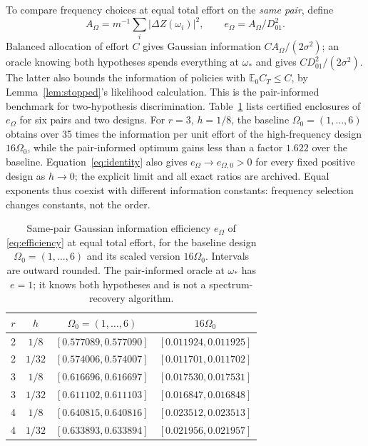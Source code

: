 \documentclass[10pt]{amsart}
\theoremstyle{definition}
\theoremstyle{remark}
\theoremstyle{plain}
\newcommand{\E}{\mathbb E}
\begin{document}
To compare frequency choices at equal total effort on the \emph{same pair}, define
\begin{equation}\label{eq:efficiency}
 A_\Omega=m^{-1}\sum_i|\Delta Z(\omega_i)|^2,\qquad
 e_\Omega=A_\Omega/D_{01}^2.
\end{equation}
Balanced allocation of effort $C$ gives Gaussian information $CA_\Omega/(2\sigma^2)$; an oracle knowing both hypotheses spends everything at $\omega_*$ and gives $CD_{01}^2/(2\sigma^2)$. The latter also bounds the information of policies with $\E_0C_T\le C$, by Lemma~\ref{lem:stopped}'s likelihood calculation. This is the pair-informed benchmark for two-hypothesis discrimination.
Table~\ref{tab:efficiency} lists certified enclosures of $e_\Omega$ for six pairs and two designs. For $r=3$, $h=1/8$, the baseline $\Omega_0=(1,\ldots,6)$ obtains over 35 times the information per unit effort of the high-frequency design $16\Omega_0$, while the pair-informed optimum gains less than a factor $1.622$ over the baseline. Equation~\eqref{eq:identity} also gives $e_\Omega\to e_{\Omega,0}>0$ for every fixed positive design as $h\to0$; the explicit limit and all exact ratios are archived. Equal exponents thus coexist with different information constants: frequency selection changes constants, not the order.

\begin{table}[tb]
\centering
\caption{Same-pair Gaussian information efficiency $e_\Omega$ of \eqref{eq:efficiency} at equal total effort, for the baseline design $\Omega_0=(1,\ldots,6)$ and its scaled version $16\Omega_0$. Intervals are outward rounded. The pair-informed oracle at $\omega_*$ has $e=1$; it knows both hypotheses and is not a spectrum-recovery algorithm.}\label{tab:efficiency}
\begin{tabular}{cccc}\toprule
$r$ & $h$ & $\Omega_0=(1,\ldots,6)$ & $16\Omega_0$ \\\midrule
2 & $1/8$ & $[0.577089, 0.577090]$ & $[0.011924, 0.011925]$ \\
2 & $1/32$ & $[0.574006, 0.574007]$ & $[0.011701, 0.011702]$ \\
3 & $1/8$ & $[0.616696, 0.616697]$ & $[0.017530, 0.017531]$ \\
3 & $1/32$ & $[0.611102, 0.611103]$ & $[0.016847, 0.016848]$ \\
4 & $1/8$ & $[0.640815, 0.640816]$ & $[0.023512, 0.023513]$ \\
4 & $1/32$ & $[0.633893, 0.633894]$ & $[0.021956, 0.021957]$ \\
\bottomrule\end{tabular}
\end{table}
\end{document}
